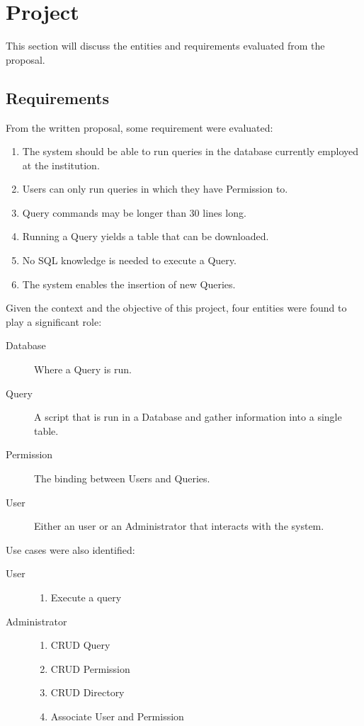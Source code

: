 \chapter{Project}
This section will discuss the entities and requirements evaluated from the proposal.

\section{Requirements}
From the written proposal, some requirement were evaluated:
\begin{enumerate}
\item The system should be able to run queries in the database currently employed at the institution.\label{req:multidb}
\item Users can only run queries in which they have Permission to.\label{req:permission}
\item Query commands may be longer than 30 lines long.\label{req:longquery}
\item Running a Query yields a table that can be downloaded.\label{req:download}
\item No \gls{SQL} knowledge is needed to execute a Query.\label{req:noknowledge}
\item The system enables the insertion of new Queries.\label{req:addquery}
\end{enumerate}

Given the context and the objective of this project, four entities were found to play a significant role:
\begin{description}
\item[Database]
  Where a Query is run.
\item[Query]
  A script that is run in a Database and gather information into a single table.
\item[Permission]
  The binding between Users and Queries.
\item[User]
  Either an user or an Administrator that interacts with the system.
\end{description}

Use cases were also identified:
\begin{description}
\item[User]
  \begin{enumerate}
  \item Execute a query
  \end{enumerate}
\item[Administrator]
  \begin{enumerate}
  \item \gls{CRUD} Query
  \item \gls{CRUD} Permission
  \item \gls{CRUD} Directory
  \item Associate User and Permission
  \end{enumerate}
\end{description}

